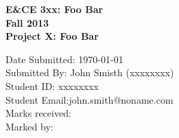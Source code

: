 \documentclass[12pt,fleqn,reqno,letterpaper]{article}
\begin{document}
\begin{titlepage}
  \begin{center}
    \vspace*{1cm}
    {\large \bfseries E\&CE 3xx: Foo Bar\\[0.6cm]}
    {\large \bfseries Fall 2013 \\[0.4cm]}
    {\large \bfseries Project X: Foo Bar \\[0.4cm]}

    \vspace{3cm}
    \begin{minipage}{\textwidth}
    \begin{flushleft} \large
      Date Submitted: \today \\[0.5cm]
      Submitted By: John Smisth (xxxxxxxx) \\[0.2cm]
      Student ID: xxxxxxxx \\[0.2cm]
      Student Email:john.smith@noname.com \\[3cm]
      Marks received: \\ [1cm]
      Marked by: \\

    \end{flushleft}
    \end{minipage}

\vfill

  \end{center}
\end{titlepage}



\tableofcontents
\clearpage



%
\end{document}
